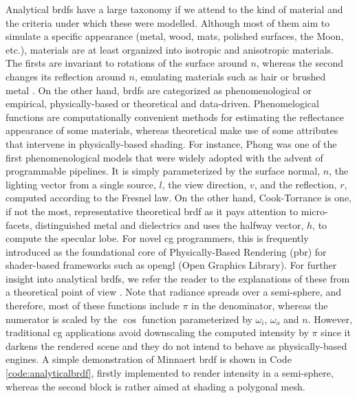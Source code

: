 Analytical \acrshort{brdf}s have a large taxonomy if we attend to the kind of material and the criteria under which these were modelled. Although most of them aim to simulate a specific appearance (metal, wood, mats, polished surfaces, the Moon, etc.), materials are at least organized into isotropic and anisotropic materials. The firsts are invariant to rotations of the surface around $n$, whereas the second changes its reflection around $n$, emulating materials such as hair or brushed metal \cite{guarnera_brdf_2016}. On the other hand, \acrshort{brdf}s are categorized as phenomenological or empirical, physically-based or theoretical and data-driven. Phenomelogical functions are computationally convenient methods for estimating the reflectance appearance of some materials, whereas theoretical make use of some attributes that intervene in physically-based shading. For instance, Phong was one of the first phenomenological models that were widely adopted with the advent of programmable pipelines. It is simply parameterized by the surface normal, $n$, the lighting vector from a single source, $l$, the view direction, $v$, and the reflection, $r$, computed according to the Fresnel law. On the other hand, Cook-Torrance is one, if not the most, representative theoretical \acrshort{brdf} as it pays attention to micro-facets, distinguished metal and dielectrics and uses the halfway vector, $h$, to compute the specular lobe. For novel \acrshort{cg} programmers, this is frequently introduced as the foundational core of Physically-Based Rendering (\acrshort{pbr}) for shader-based frameworks such as \acrshort{opengl} (Open Graphics Library). For further insight into analytical \acrshort{brdf}s, we refer the reader to the explanations of these from a theoretical point of view \cite{guarnera_brdf_2016, soldado_overview_2012}. Note that radiance spreads over a semi-sphere, and therefore, most of these functions include $\pi$ in the denominator, whereas the numerator is scaled by the $\cos$ function parameterized by $\omega_i$, $\omega_o$ and $n$. However, traditional \acrshort{cg} applications avoid downscaling the computed intensity by $\pi$ since it darkens the rendered scene and they do not intend to behave as physically-based engines. A simple demonstration of Minnaert \acrshort{brdf} is shown in Code \ref{code:analyticalbrdf}, firstly implemented to render intensity in a semi-sphere, whereas the second block is rather aimed at shading a polygonal mesh.

\vspace{3mm}


